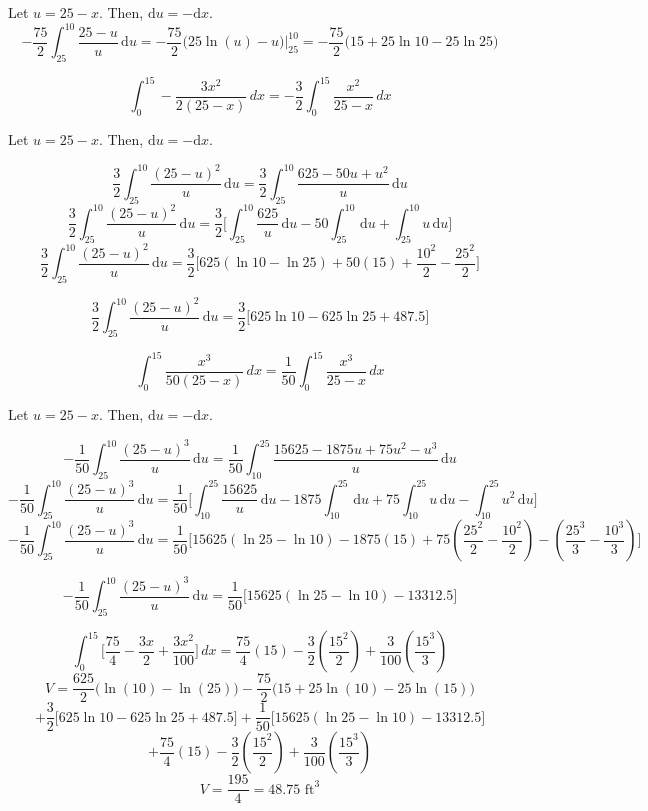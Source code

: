 \documentclass[12pt]{article}
\begin{document}
Let $u = 25 - x$. Then, $\mathrm{d}u = -\mathrm{d}x.$
\small{
\[-\frac{75}{2} \int_{25}^{10} \frac{25 - u}{u} \, \mathrm{d}u = -\frac{75}{2}\Bigg(25\ln(u) - u\Bigg) \Bigg |_{25}^{10} = -\frac{75}{2}\Bigg( 15 + 25 \ln 10 - 25 \ln 25\Bigg)\]}


\[
\int_{0}^{15} -\frac{3x^2}{2(25 - x)} \,dx = -\frac{3}{2} \int_{0}^{15} \frac{x^2}{25 - x} \,dx
\]

Let \( u = 25 - x \). Then, \( \mathrm{d}u = -\mathrm{d}x \).

\small{
\[
\frac{3}{2} \int_{25}^{10} \frac{(25 - u)^2}{u} \, \mathrm{d}u = \frac{3}{2} \int_{25}^{10} \frac{625 - 50u + u^2}{u} \,\mathrm{d}u
\]
\[
\frac{3}{2} \int_{25}^{10} \frac{(25 - u)^2}{u} \, \mathrm{d}u  = \frac{3}{2} \Bigg[ \int_{25}^{10} \frac{625}{u} \,\mathrm{d}u - 50 \int_{25}^{10} \,\mathrm{d}u + \int_{25}^{10} u \,\mathrm{d}u \Bigg]
\]
\[
\frac{3}{2} \int_{25}^{10} \frac{(25 - u)^2}{u} \, \mathrm{d}u = \frac{3}{2} \Bigg[ 625 (\ln 10 - \ln 25) + 50(15) + \frac{10^2}{2} - \frac{25^2}{2} \Bigg]
\]

\[
\frac{3}{2} \int_{25}^{10} \frac{(25 - u)^2}{u} \, \mathrm{d}u  = \frac{3}{2} \Bigg[ 625 \ln 10 - 625 \ln 25 +487.5\Bigg]
\]

}

\[
\int_{0}^{15} \frac{x^3}{50(25 - x)} \,dx = \frac{1}{50} \int_{0}^{15} \frac{x^3}{25 - x} \,dx
\]

Let \( u = 25 - x \). Then, \( \mathrm{d}u = -\mathrm{d}x \).

\small{
\[
-\frac{1}{50} \int_{25}^{10} \frac{(25 - u)^3}{u} \, \mathrm{d}u = \frac{1}{50} \int_{10}^{25} \frac{15625 - 1875u + 75u^2 - u^3}{u} \,\mathrm{d}u
\]
\[
-\frac{1}{50} \int_{25}^{10} \frac{(25 - u)^3}{u} \, \mathrm{d}u = \frac{1}{50} \Bigg[ \int_{10}^{25} \frac{15625}{u} \,\mathrm{d}u - 1875 \int_{10}^{25} \,\mathrm{d}u + 75 \int_{10}^{25} u \,\mathrm{d}u - \int_{10}^{25} u^2 \,\mathrm{d}u \Bigg]
\]
\[
-\frac{1}{50} \int_{25}^{10} \frac{(25 - u)^3}{u} \, \mathrm{d}u = \frac{1}{50} \Bigg[ 15625 (\ln 25 - \ln 10) - 1875(15) + 75 \left( \frac{25^2}{2} - \frac{10^2}{2} \right) - \left( \frac{25^3}{3} - \frac{10^3}{3} \right) \Bigg]
\]

\[
-\frac{1}{50} \int_{25}^{10} \frac{(25 - u)^3}{u} \, \mathrm{d}u = \frac{1}{50} \Bigg[ 15625(\ln 25 - \ln 10) - 13312.5\Bigg]
\]
}

\[
\int_{0}^{15} \Bigg[ 
\frac{75}{4} 
- \frac{3x}{2} 
+ \frac{3x^2}{100} 
\Bigg] \,dx = \frac{75}{4}(15) - \frac{3}{2}\left(\frac{15^2}{2}\right) + \frac{3}{100}\left(\frac{15^3}{3}\right)\]
\small{
\[V = \frac{625}{2}\Bigg(\ln(10) - \ln(25)\Bigg) -\frac{75}{2}\Bigg( 15 + 25 \ln(10) - 25 \ln(15)\Bigg)\] 
\[ + \frac{3}{2} \Bigg[ 625 \ln 10 - 625 \ln 25 +487.5\Bigg] + \frac{1}{50}\Bigg[ 15625(\ln 25 - \ln 10) - 13312.5\Bigg]\]  \[+\frac{75}{4}(15) - \frac{3}{2}\left(\frac{15^2}{2}\right) + \frac{3}{100}\left(\frac{15^3}{3}\right)\] 
}
\[ V = \frac{195}{4} = 48.75 \text{ ft}^3\]
\end{document}
